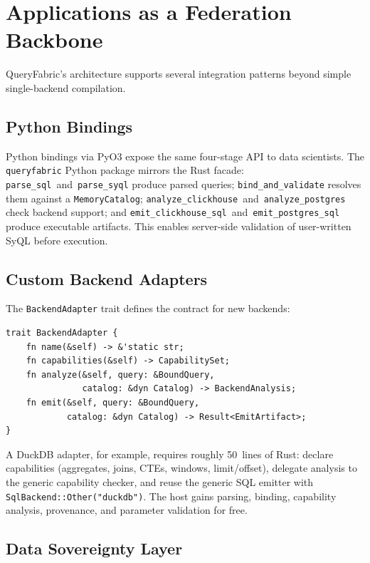 \documentclass[11pt,a4paper]{article}
\begin{document}
\section{Applications as a Federation Backbone}
\label{sec:applications}

QueryFabric's architecture supports several integration patterns beyond
simple single-backend compilation.

\subsection{Python Bindings}

Python bindings via PyO3 expose the same four-stage API to data scientists.
The \texttt{queryfabric} Python package mirrors the Rust facade:
\texttt{parse\_sql}~and~\texttt{parse\_syql} produce parsed queries;
\texttt{bind\_and\_validate} resolves them against a \texttt{MemoryCatalog};
\texttt{analyze\_clickhouse}~and~\texttt{analyze\_postgres} check backend
support; and \texttt{emit\_clickhouse\_sql}~and~\texttt{emit\_postgres\_sql}
produce executable artifacts.
This enables server-side validation of user-written SyQL before execution.

\subsection{Custom Backend Adapters}

The \texttt{BackendAdapter} trait defines the contract for new backends:
\begin{verbatim}
trait BackendAdapter {
    fn name(&self) -> &'static str;
    fn capabilities(&self) -> CapabilitySet;
    fn analyze(&self, query: &BoundQuery,
               catalog: &dyn Catalog) -> BackendAnalysis;
    fn emit(&self, query: &BoundQuery,
            catalog: &dyn Catalog) -> Result<EmitArtifact>;
}
\end{verbatim}

A DuckDB adapter, for example, requires roughly 50~lines of Rust:
declare capabilities (aggregates, joins, CTEs, windows, limit/offset),
delegate analysis to the generic capability checker, and reuse the generic
SQL emitter with \texttt{SqlBackend::Other("duckdb")}.
The host gains parsing, binding, capability analysis, provenance, and
parameter validation for free.

\subsection{Data Sovereignty Layer}
\end{document}
